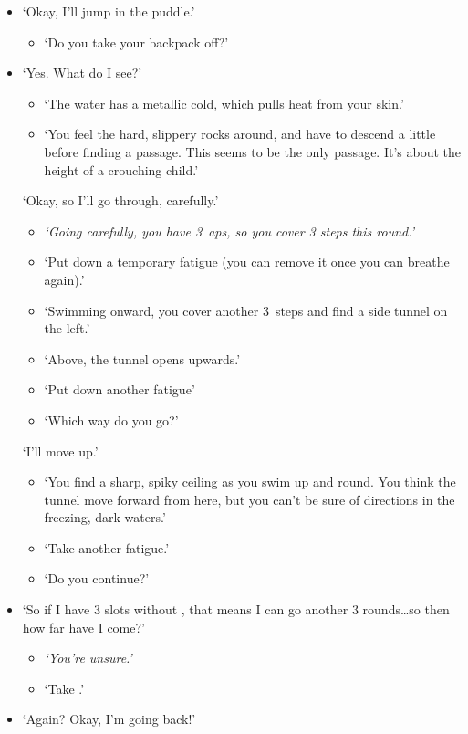 \begin{multicols}{2}
\begin{itemize}
  \bf
  \item
  `Okay, I'll jump in the puddle.'
  \begin{itemize}
    \it
    \item
    `Do you take your backpack off?'
  \end{itemize}
  \item
  `Yes.
  What do I see?'
  \begin{itemize}
    \it
    \item
    `The water has a metallic cold, which pulls heat from your skin.'
    \item
    `You feel the hard, slippery rocks around, and have to descend a little before finding a passage.
    This seems to be the only passage.
    It's about the height of a crouching child.'
  \end{itemize}
  `Okay, so I'll go through, carefully.'
  \begin{itemize}
    \item
    \it
    `Going carefully, you have 3~\glspl{ap}, so you cover 3 steps this round.'
    \item
    `Put down a temporary \gls{fatigue} (you can remove it once you can breathe again).'
    \item
    `Swimming onward, you cover another 3~\glspl{step} and find a side tunnel on the left.'
    \item
    `Above, the tunnel opens upwards.'
    \item
    `Put down another \gls{fatigue}'
    \item
    `Which way do you go?'
  \end{itemize}
  `I'll move up.'
  \begin{itemize}
    \it
    \item
    `You find a sharp, spiky ceiling as you swim up and round.
    You think the tunnel move forward from here, but you can't be sure of directions in the freezing, dark waters.'
    \item
    `Take another \gls{fatigue}.'
    \item
    `Do you continue?'
  \end{itemize}
  \item
  `So if I have 3 slots without , that means I can go another 3 rounds\ldots so then how far have I come?'
  \begin{itemize}
    \item
    \it
    `You're unsure.'
    \item
    `Take .'
  \end{itemize}
  \item
  `Again?
  Okay, I'm going back!'
\end{itemize}


\end{multicols}
